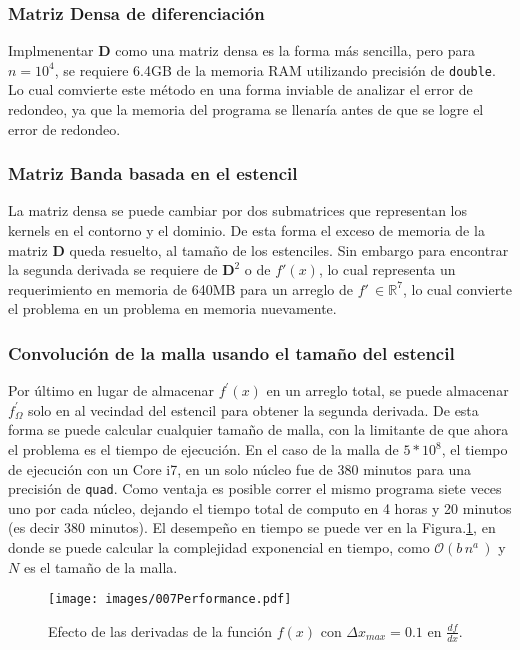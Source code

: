 \documentclass[9pt,technote,twoside,letterpaper,onecolumn]{IEEEtran}
\begin{document}
\begin{multicols}{2}
\subsubsection{Matriz Densa de diferenciación}
\label{sec:imp_matrix}
Implmenentar $\mathbf{D}$ como una matriz densa es la forma más sencilla, pero para $n=10^4$, se requiere 6.4GB de la memoria RAM utilizando precisión de \verb.double.. Lo cual comvierte este método en una forma inviable de analizar el error de redondeo, ya que la memoria del programa se llenaría antes de que se logre el error de redondeo. 
\subsubsection{Matriz Banda basada en el estencil}
\label{sec:imp_matrix_band}
La matriz densa se puede cambiar por dos submatrices que representan los kernels en el contorno y el dominio. De esta forma el exceso de memoria de la matriz $\mathbf{D}$ queda resuelto, al tamaño de los estenciles. Sin embargo para encontrar la segunda derivada se requiere de $\mathbf{D}^2$ o de $f'(x)$, lo cual representa un requerimiento en memoria de 640MB para un arreglo de $f'\,\in\mathbb{R}^7$, lo cual convierte el problema en un problema en memoria nuevamente.
\subsubsection{Convolución de la malla usando el tamaño del estencil}
\label{sec:imp_conv}
Por último en lugar de almacenar $f^{'}(x)$ en un arreglo total, se puede almacenar $f^{'}_{\Omega}$ solo en al vecindad del estencil para obtener la segunda derivada. De esta forma se puede calcular cualquier tamaño de malla, con la limitante de que ahora el problema es el tiempo de ejecución. En el caso de la malla de $5*10^8$, el tiempo de ejecución con un Core i7, en un solo núcleo fue de 380 minutos para una precisión de \verb.quad.. Como ventaja es posible correr el mismo programa siete veces uno por cada núcleo, dejando el tiempo total de computo en 4 horas y 20 minutos (es decir 380 minutos). El desempeño en tiempo se puede ver en la Figura.\ref{fig:performance}, en donde se puede calcular la complejidad exponencial en tiempo, como $\mathcal{O}(b\,n^a\,)$ y $N$ es el tamaño de la malla.

\begin{figure}[H]
  \texttt{[image: images/007Performance.pdf]}
  \caption{Efecto de las derivadas de la función $f(x)$ con $\Delta x_{max}=0.1$ en $\frac{df}{dx}$.}
  \label{fig:performance}
  \centering
\end{figure}


\end{multicols}
\end{document}
